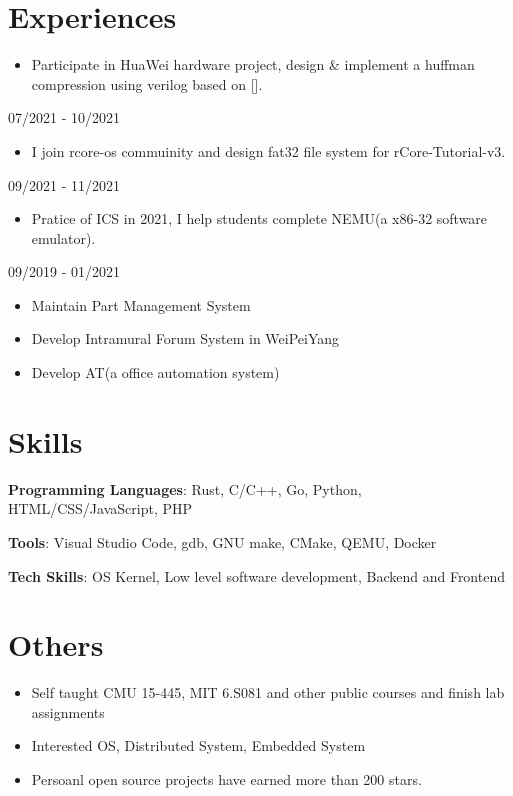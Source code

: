 \documentclass{chicv}
\begin{document}
\section{Experiences}
\begin{itemize}
  \item Participate in HuaWei hardware project, design \& implement a huffman compression using verilog based on [].
\end{itemize}
{07/2021 - 10/2021}
\begin{itemize}
  \item I join rcore-os commuinity and design fat32 file system for rCore-Tutorial-v3.
\end{itemize}

{09/2021 - 11/2021}
\begin{itemize}
  \item Pratice of ICS in 2021, I help students complete NEMU(a x86-32 software emulator).
\end{itemize}

{09/2019 - 01/2021}
\begin{itemize}
  \item Maintain Part Management System 
  \item Develop Intramural Forum System in WeiPeiYang
  \item Develop AT(a office automation system)
\end{itemize}



\section{Skills}

\begin{compactlist}
  \item \textbf{Programming Languages}: Rust, C/C++, Go, Python, HTML/CSS/JavaScript, PHP
  \item \textbf{Tools}: Visual Studio Code, gdb, GNU make, CMake, QEMU, Docker
  \item \textbf{Tech Skills}: OS Kernel, Low level software development, Backend and Frontend
\end{compactlist}

\section{Others}
\begin{itemize}
  \item Self taught CMU 15-445, MIT 6.S081 and other public courses and finish lab assignments 
  \item Interested OS, Distributed System, Embedded System 
  \item Persoanl open source projects have earned more than 200 stars.
\end{itemize}
\end{document}
